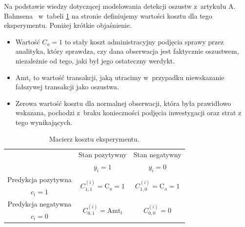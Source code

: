 \documentclass[inzynierska]{pwr_wmat_praca_dyplomowa}
\theoremstyle{plain}
\numberwithin{theorem}{chapter}
\theoremstyle{definition}
\numberwithin{theorem}{chapter}
\begin{document}
Na podstawie wiedzy dotyczącej modelowania detekcji oszustw z~artykułu A. Bahnsena~\cite{alej2015ensemble} w~tabeli \ref{tab:macierz-kosztu-eksperyment} na stronie \pageref{tab:macierz-kosztu-eksperyment} definiujemy wartości kosztu dla tego eksperymentu. Poniżej krótkie objaśnienie.
\begin{itemize}
	\item Wartość $C_a = 1$ to stały koszt administracyjny podjęcia sprawy przez analityka, który sprawdza, czy dana obserwacja jest faktycznie oszustwem, niezależnie od tego, jaki był jego ostateczny werdykt.
	\item $\text{Amt}_i$ to wartość transakcji, jaką utracimy w~przypadku niewskazanie fałszywej transakcji jako oszustwa.
	\item Zerowa wartość kosztu dla normalnej obserwacji, która była prawidłowo wskazana, pochodzi z~braku konieczności podjęcia inwestygacji oraz strat z tego wynikających.
\end{itemize} 

\begin{table}[h]
	\begin{center}
		\begin{tabular}{c|c|c}
			\multirow{2}{4em}{} & Stan pozytywny & Stan negatywny \\
			& $y_i = 1$            & $y_i = 0$ \\
			\hline
			Predykcja pozytywna & \multirow{2}{8em}{\centering $C^{(i)}_{1,1} = \text{C}_{\text{a}} = 1$} & \multirow{2}{8em}{\centering $C^{(i)}_{1,0} = \text{C}_{\text{a}} = 1$} \\
			$c_i = 1$         &                    &                    \\
			\hline
			Predykcja negatywna & \multirow{2}{8em}{\centering $C^{(i)}_{0,1} = \text{Amt}_{\text{i}}$} & \multirow{2}{8em}{\centering $C^{(i)}_{0,0} = 0$} \\
			$c_i = 0$         &                    &                    \\
		\end{tabular}
	\end{center}
	\caption{Macierz kosztu eksperymentu.}
	\label{tab:macierz-kosztu-eksperyment}
\end{table}
\end{document}
